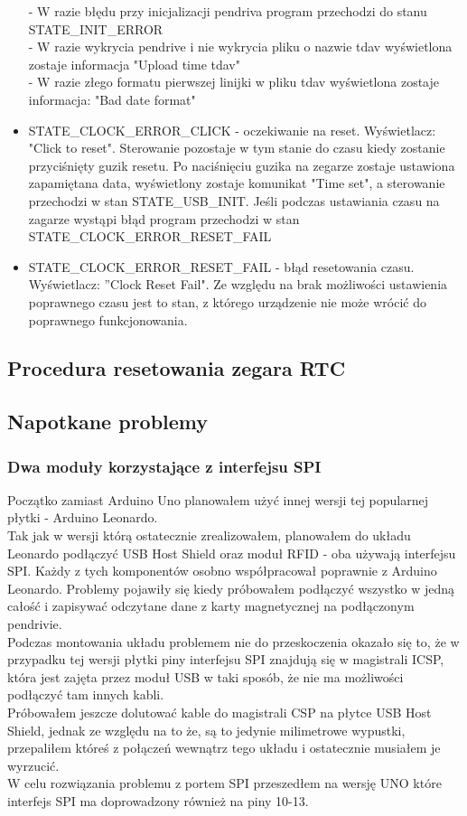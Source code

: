 \documentclass[declaration,shortabstract, mgr]{iithesis}
\begin{document}
\begin{itemize}
- W razie błędu przy inicjalizacji pendriva program przechodzi do stanu STATE\_INIT\_ERROR \\
- W razie wykrycia pendrive i nie wykrycia pliku o nazwie tdav wyświetlona zostaje informacja "Upload time tdav"\\
- W razie złego formatu pierwszej linijki w pliku tdav wyświetlona zostaje informacja: "Bad date format"
\item STATE\_CLOCK\_ERROR\_CLICK - oczekiwanie na reset. Wyświetlacz: "Click to reset". Sterowanie pozostaje w tym stanie do czasu kiedy zostanie przyciśnięty guzik resetu. Po naciśnięciu guzika na zegarze zostaje ustawiona zapamiętana data, wyświetlony zostaje komunikat "Time set", a sterowanie przechodzi w stan STATE\_USB\_INIT. Jeśli podczas ustawiania czasu na zagarze wystąpi błąd program przechodzi w stan STATE\_CLOCK\_ERROR\_RESET\_FAIL \\
\item STATE\_CLOCK\_ERROR\_RESET\_FAIL - błąd resetowania czasu. Wyświetlacz: ''Clock Reset Fail". Ze względu na brak możliwości ustawienia poprawnego czasu jest to stan, z którego urządzenie nie może wrócić do poprawnego funkcjonowania.
\end{itemize}
\subsection{Procedura resetowania zegara RTC}

\subsection{Napotkane problemy}
\subsubsection{Dwa moduły korzystające z interfejsu SPI}
\indent Początko zamiast Arduino Uno planowałem użyć innej wersji tej popularnej płytki - Arduino Leonardo. \\
\indent Tak jak w wersji którą ostatecznie zrealizowałem, planowałem do układu Leonardo podłączyć USB Host Shield oraz moduł RFID - oba używają interfejsu SPI. Każdy z tych komponentów osobno współpracował poprawnie z Arduino Leonardo. Problemy pojawiły się kiedy próbowałem podłączyć wszystko w jedną całość i zapisywać odczytane dane z karty magnetycznej na podłączonym pendrivie. \\
\indent Podczas montowania układu problemem nie do przeskoczenia okazało się to, że w przypadku tej wersji płytki piny interfejsu SPI znajdują się w magistrali ICSP, która jest zajęta przez moduł USB w taki sposób, że nie ma możliwości podłączyć tam innych kabli. \\
\indent Próbowałem jeszcze dolutować kable do magistrali CSP na płytce USB Host Shield, jednak ze względu na to że, są to jedynie milimetrowe wypustki, przepaliłem któreś z połączeń wewnątrz tego układu i ostatecznie musiałem je wyrzucić. \\
\indent W celu rozwiązania problemu z portem SPI przeszedłem na wersję UNO które interfejs SPI ma doprowadzony również na piny 10-13. \\
\end{document}
